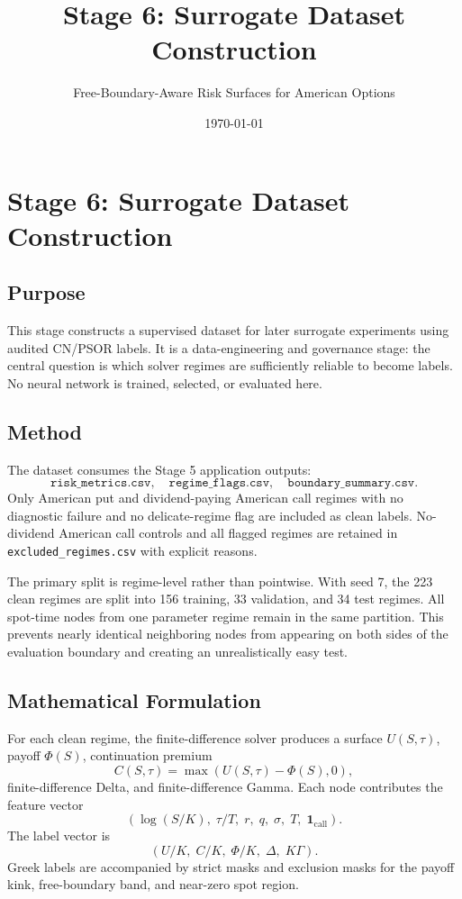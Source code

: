 \documentclass[11pt]{article}
\title{Stage 6: Surrogate Dataset Construction}
\author{Free-Boundary-Aware Risk Surfaces for American Options}
\date{\today}
\begin{document}
\maketitle

\section{Stage 6: Surrogate Dataset Construction}

\subsection{Purpose}
This stage constructs a supervised dataset for later surrogate experiments
using audited CN/PSOR labels. It is a data-engineering and governance stage:
the central question is which solver regimes are sufficiently reliable to
become labels. No neural network is trained, selected, or evaluated here.

\subsection{Method}
The dataset consumes the Stage 5 application outputs:
\[
\texttt{risk\_metrics.csv},\quad
\texttt{regime\_flags.csv},\quad
\texttt{boundary\_summary.csv}.
\]
Only American put and dividend-paying American call regimes with no diagnostic failure and no delicate-regime flag are included as clean labels. No-dividend American call controls and all flagged regimes are retained in \texttt{excluded\_regimes.csv} with explicit reasons.

The primary split is regime-level rather than pointwise. With seed 7, the 223
clean regimes are split into 156 training, 33 validation, and 34 test regimes.
All spot-time nodes from one parameter regime remain in the same partition.
This prevents nearly identical neighboring nodes from appearing on both sides
of the evaluation boundary and creating an unrealistically easy test.

\subsection{Mathematical Formulation}
For each clean regime, the finite-difference solver produces a surface $U(S,\tau)$, payoff $\Phi(S)$, continuation premium
\[
C(S,\tau)=\max(U(S,\tau)-\Phi(S),0),
\]
finite-difference Delta, and finite-difference Gamma. Each node contributes the feature vector
\[
\left(\log(S/K),\;\tau/T,\;r,\;q,\;\sigma,\;T,\;\mathbf{1}_{\mathrm{call}}\right).
\]
The label vector is
\[
\left(U/K,\;C/K,\;\Phi/K,\;\Delta,\;K\Gamma\right).
\]
Greek labels are accompanied by strict masks and exclusion masks for the payoff kink, free-boundary band, and near-zero spot region.
\end{document}
